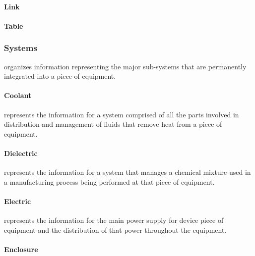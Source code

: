 \paragraph{Link}\mbox{}
\label{sec:Link}





\paragraph{Table}\mbox{}
\label{sec:Table}





\subsubsection{Systems}
\label{sec:Systems}



 organizes information representing the major sub-systems that are permanently integrated into a piece of equipment.


\paragraph{Coolant}\mbox{}
\label{sec:Coolant}


 represents the information for a system comprised of all the parts involved in distribution and management of fluids that remove heat from a piece of equipment.


\paragraph{Dielectric}\mbox{}
\label{sec:Dielectric}


 represents the information for a system that manages a chemical mixture used in a manufacturing process being performed at that piece of equipment.


\paragraph{Electric}\mbox{}
\label{sec:Electric}


 represents the information for the main power supply for device piece of equipment and the distribution of that power throughout the equipment.


\paragraph{Enclosure}\mbox{}
\label{sec:Enclosure}



